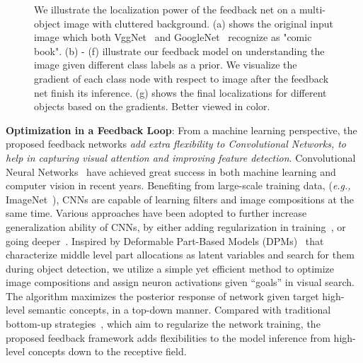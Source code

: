\begin{figure}[htb]
\begin{center}
\begin{tabular}{ccccccc}
\end{tabular}
\caption{We illustrate the localization power of the feedback net on a multi-object image with cluttered background. (a) shows the original input image which both VggNet~\cite{Simonyan2014Very} and GoogleNet~\cite{Szegedy2014Going} recognize as "comic book". (b) - (f) illustrate our feedback model on understanding the image given different class labels as a prior. We visualize the gradient of each class node with respect to image after the feedback net finish its inference. (g) shows the final localizations for different objects based on the gradients. Better viewed in color.}
\label{fig:splah}
\end{center}
\end{figure}

\textbf{Optimization in a Feedback Loop}:
From a machine learning perspective, the proposed feedback networks \emph{add extra flexibility to Convolutional Networks, to help in capturing visual attention and improving feature detection}. Convolutional Neural Networks~\cite{lecun1998gradient, Krizhevsky2012ImageNet, Simonyan2014Very} have achieved great success in both machine learning and computer vision in recent years. Benefiting from large-scale training data, (\emph{e.g.,} ImageNet~\cite{deng2009imagenet}), CNNs are capable of learning filters and image compositions at the same time. Various approaches have been adopted to further increase generalization ability of CNNs, by either adding regularization in training~\cite{he2015delving,ioffe2015batch}, or going deeper~\cite{Simonyan2014Very, Szegedy2014Going}. Inspired by Deformable Part-Based Models (DPMs)~\cite{Felzenszwalb2010Object} that characterize middle level part allocations as latent variables and search for them during object detection, we utilize a simple yet efficient method to optimize image compositions and assign neuron activations given ``goals'' in visual search. The algorithm maximizes the posterior response of network given target high-level semantic concepts, in a top-down manner. Compared with traditional bottom-up strategies~\cite{he2015delving, ioffe2015batch}, which aim to regularize the network training, the proposed feedback framework adds flexibilities to the model inference from high-level concepts down to the receptive field.

